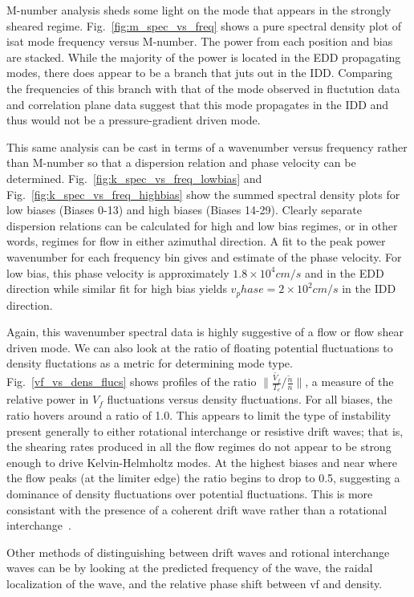 \documentclass[aip,pop,amsmath,amssymb,preprint,superscriptaddress]{revtex4-1} %
\begin{document}
M-number analysis sheds some light on the mode that appears in the strongly sheared regime. Fig.~\ref{fig:m_spec_vs_freq} shows a pure spectral density plot of isat mode frequency versus M-number. The power from each position and bias are stacked. While the majority of the power is located in the EDD propagating modes, there does appear to be a branch that juts out in the IDD. Comparing the frequencies of this branch with that of the mode observed in fluctution data and correlation plane data suggest that this mode propagates in the IDD and thus would not be a pressure-gradient driven mode.

This same analysis can be cast in terms of a wavenumber versus frequency rather than M-number so that a dispersion relation and phase velocity can be determined. Fig.~\ref{fig:k_spec_vs_freq_lowbias} and Fig.~\ref{fig:k_spec_vs_freq_highbias} show the summed spectral density plots for low biases (Biases 0-13) and high biases (Biases 14-29). Clearly separate dispersion relations can be calculated for high and low bias regimes, or in other words, regimes for flow in either azimuthal direction. A fit to the peak power wavenumber for each frequency bin gives and estimate of the phase velocity. For low bias, this phase velocity is approximately $1.8 \times 10^4 cm/s$ and in the EDD direction while similar fit for high bias yields $v_phase = 2 \times 10^2 cm/s$ in the IDD direction.

Again, this wavenumber spectral data is highly suggestive of a flow or flow shear driven mode. We can also look at the ratio of floating potential fluctuations to density fluctations as a metric for determining mode type. Fig.~\ref{vf_vs_dens_flucs} shows profiles of the ratio $\| \frac{\tilde{V_{f}}}{T_{e}} / \frac{\tilde{n}}{n}\|$, a measure of the relative power in $V_f$ fluctuations versus density fluctuations. For all biases, the ratio hovers around a ratio of 1.0. This appears to limit the type of instability present generally to either rotational interchange or resistive drift waves; that is, the shearing rates produced in all the flow regimes do not appear to be strong enough to drive Kelvin-Helmholtz modes. At the highest biases and near where the flow peaks (at the limiter edge) the ratio begins to drop to 0.5, suggesting a dominance of density fluctuations over potential fluctuations. This is more consistant with the presence of a coherent drift wave rather than a rotational interchange~\cite{jassby72}.

Other methods of distinguishing between drift waves and rotional interchange waves can be by looking at the predicted frequency of the wave, the raidal localization of the wave, and the relative phase shift between vf and density.
\end{document}
